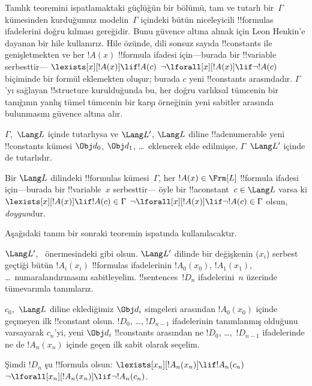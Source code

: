 \documentclass[../../../include/open-logic-section]{subfiles}
\begin{document}


\begin{explain}
Tamlık teoremini ispatlamaktaki güçlüğün bir bölümü, tam ve tutarlı
bir~$\Gamma$ kümesinden kurduğumuz modelin~$\Gamma$ içindeki bütün
niceleyicili !!{formula}s ifadelerini doğru kılması gereğidir. Bunu
güvence altına almak için Leon Henkin'e dayanan bir hile kullanırız.
Hile özünde, dili sonsuz sayıda !!{constant}s ile genişletmekten ve her
$!A(x)$ !!{formula} ifadesi için---burada bir !!{variable} serbesttir---
      {$\lexists[x][!A(x)]\lif !A(c)$}
      {$\lnot\lforall[x][!A(x)]\lif\lnot !A(c)$}
biçiminde bir formül eklemekten oluşur; burada $c$ yeni
!!{constant}s arasındadır. $\Gamma$'yı sağlayan !!{structure}
kurulduğunda bu, her
{doğru varlıksal tümcenin bir tanığının}
{yanlış tümel tümcenin bir karşı örneğinin}
yeni sabitler arasında bulunmasını güvence altına alır.
\end{explain}

\begin{prop}
$\Gamma$,~$\Lang L$ içinde tutarlıysa ve $\Lang L'$,
$\Lang L$ diline !!a{denumerable} yeni !!{constant}s kümesi
$\Obj d_0$, $\Obj d_1$, \dots\ eklenerek elde edilmişse,
$\Gamma$~$\Lang L'$ içinde de tutarlıdır.
\end{prop}

\begin{defn}
Bir $\Lang L$ dilindeki !!{formula}s kümesi~$\Gamma$, her
$!A(x)\in\Frm[L]$ !!{formula} ifadesi için---burada bir !!{variable}~$x$
serbesttir---
öyle bir !!a{constant}~$c\in\Lang L$ varsa ki
      {$\lexists[x][!A(x)]\lif !A(c)\in\Gamma$}
      {$\lnot\lforall[x][!A(x)]\lif\lnot !A(c)\in\Gamma$}
olsun, \emph{doygun}dur.
\end{defn}

Aşağıdaki tanım bir sonraki teoremin ispatında kullanılacaktır.

\begin{defn}
$\Lang L'$,~ önermesindeki gibi olsun.
$\Lang L'$ dilinde bir değişkenin ($x_i$) serbest geçtiği bütün
$!A_i(x_i)$ !!{formula}s ifadelerinin $!A_0(x_0)$, $!A_1(x_1)$, \dots\
numaralandırmasını sabitleyelim. !!{sentence}s~$!D_n$ ifadelerini~$n$
üzerinde tümevarımla tanımlarız.

$c_0$,~$\Lang L$ diline eklediğimiz $\Obj d_i$ simgeleri arasından
$!A_0(x_0)$ içinde geçmeyen ilk !!{constant} olsun. $!D_0$, \dots,
$!D_{n-1}$ ifadelerinin tanımlanmış olduğunu varsayarak $c_n$'yi, yeni
$\Obj d_i$ !!{constant}s arasından ne $!D_0$, \dots,~$!D_{n-1}$
ifadelerinde ne de $!A_n(x_n)$ içinde geçen ilk sabit olarak seçelim.

Şimdi $!D_n$ şu !!{formula} olsun: 
{$\lexists[x_n][!A_n(x_n)]\lif !A_n(c_n)$}
{$\lnot\lforall[x_n][!A_n(x_n)]\lif\lnot !A_n(c_n)$}.
\end{defn}
\end{document}
